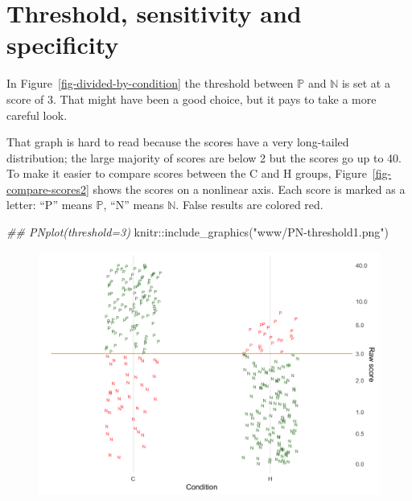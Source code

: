 \documentclass[
  letterpaper,
  DIV=11,
  numbers=noendperiod,
  oneside]{scrreprt}
\newenvironment{Shaded}{\begin{snugshade}}{\end{snugshade}}
\newcommand{\DocumentationTok}[1]{\textcolor[rgb]{0.37,0.37,0.37}{\textit{#1}}}
\newcommand{\FunctionTok}[1]{\textcolor[rgb]{0.28,0.35,0.67}{#1}}
\newcommand{\NormalTok}[1]{\textcolor[rgb]{0.00,0.23,0.31}{#1}}
\newcommand{\SpecialCharTok}[1]{\textcolor[rgb]{0.37,0.37,0.37}{#1}}
\newcommand{\StringTok}[1]{\textcolor[rgb]{0.13,0.47,0.30}{#1}}
\begin{document}
\hypertarget{threshold-sensitivity-and-specificity}{%
\section{Threshold, sensitivity and
specificity}\label{threshold-sensitivity-and-specificity}}

In Figure~\ref{fig-divided-by-condition} the threshold between
\({\mathbb{P}}\) and \({\mathbb{N}}\) is set at a score of 3. That might
have been a good choice, but it pays to take a more careful look.

That graph is hard to read because the scores have a very long-tailed
distribution; the large majority of scores are below 2 but the scores go
up to 40. To make it easier to compare scores between the C and H
groups, Figure~\ref{fig-compare-scores2} shows the scores on a nonlinear
axis. Each score is marked as a letter: ``P'' means \({\mathbb{P}}\),
``N'' means \({\mathbb{N}}\). False results are colored red.

\begin{Shaded}
\begin{Highlighting}[]
\DocumentationTok{\#\# PNplot(threshold=3)}
\NormalTok{knitr}\SpecialCharTok{::}\FunctionTok{include\_graphics}\NormalTok{(}\StringTok{"www/PN{-}threshold1.png"}\NormalTok{)}
\end{Highlighting}
\end{Shaded}

\begin{figure}[H]


{\centering \includegraphics[width=4.48in,height=\textheight]{./www/PN-threshold1.png}

}

\end{figure}
\end{document}
